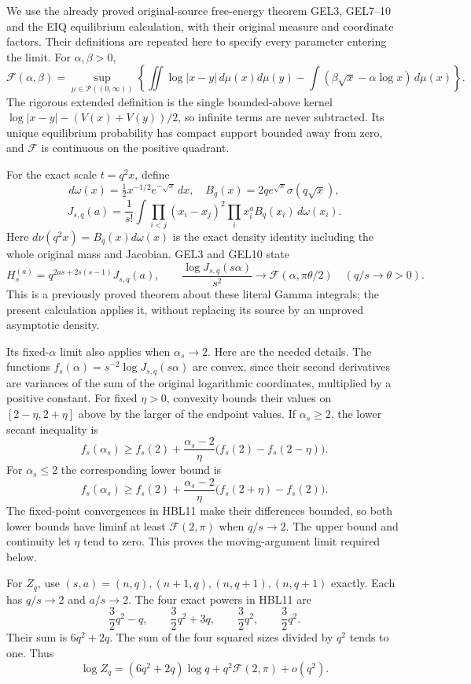 We use the already proved original-source free-energy theorem GEL3,
GEL7--10 and the EIQ equilibrium calculation, with their original
measure and coordinate factors. Their definitions are repeated here
to specify every parameter entering the limit. For $\alpha,\beta>0$,
\[
 \mathcal F(\alpha,\beta)=\sup_{\mu\in\mathcal P((0,\infty))}
 \left\{\iint\log|x-y|\,d\mu(x)d\mu(y)
            -\int(\beta\sqrt x-\alpha\log x)\,d\mu(x)\right\}.
 \tag{HBL10}
\]
The rigorous extended definition is the single bounded-above kernel
$\log|x-y|-(V(x)+V(y))/2$, so infinite terms are never subtracted.
Its unique equilibrium probability has compact support bounded away
from zero, and $\mathcal F$ is continuous on the positive quadrant.

For the exact scale $t=q^2x$, define
\[
 d\omega(x)=\tfrac12x^{-1/2}e^{-\sqrt x}\,dx,
 \quad B_q(x)=2qe^{\sqrt x}\sigma(q\sqrt x),
\]
\[
 J_{s,q}(a)=\frac1{s!}\int\prod_{i<j}(x_i-x_j)^2
                    \prod_i x_i^aB_q(x_i)\,d\omega(x_i).
\]
Here $d\nu(q^2x)=B_q(x)d\omega(x)$ is the exact density identity
including the whole original mass and Jacobian. GEL3 and GEL10 state
\[
 H_s^{(a)}=q^{2as+2s(s-1)}J_{s,q}(a),\qquad
 \frac{\log J_{s,q}(s\alpha)}{s^2}
       \longrightarrow\mathcal F(\alpha,\pi\theta/2)
       \quad(q/s\to\theta>0).
 \tag{HBL11}
\]
This is a previously proved theorem about these literal Gamma integrals;
the present calculation applies it, without replacing its source by an
unproved asymptotic density.

Its fixed-$\alpha$ limit also applies when $\alpha_s\to2$. Here are
the needed details. The functions
$f_s(\alpha)=s^{-2}\log J_{s,q}(s\alpha)$ are convex, since their
second derivatives are variances of the sum of the original logarithmic
coordinates, multiplied by a positive constant. For fixed $\eta>0$,
convexity bounds their values on $[2-\eta,2+\eta]$ above by the larger
of the endpoint values. If $\alpha_s\ge2$, the lower secant inequality is
\[
 f_s(\alpha_s)\ge f_s(2)
 +\frac{\alpha_s-2}{\eta}\big(f_s(2)-f_s(2-\eta)\big).
\]
For $\alpha_s\le2$ the corresponding lower bound is
\[
 f_s(\alpha_s)\ge f_s(2)
 +\frac{\alpha_s-2}{\eta}\big(f_s(2+\eta)-f_s(2)\big).
\]
The fixed-point convergences in HBL11 make their differences bounded,
so both lower bounds have liminf at least $\mathcal F(2,\pi)$ when
$q/s\to2$. The upper bound and continuity let $\eta$ tend to zero.
This proves the moving-argument limit required below.

For $Z_q$, use $(s,a)=(n,q),(n+1,q),(n,q+1),(n,q+1)$ exactly.
Each has $q/s\to2$ and $a/s\to2$. The four exact powers in HBL11 are
\[
 \frac32q^2-q,\qquad\frac32q^2+3q,
 \qquad\frac32q^2,\qquad\frac32q^2.
\]
Their sum is $6q^2+2q$. The sum of the four squared sizes divided
by $q^2$ tends to one. Thus
\[
 \boxed{\log Z_q=(6q^2+2q)\log q
                      +q^2\mathcal F(2,\pi)+o(q^2).}
 \tag{HBL12}
\]

